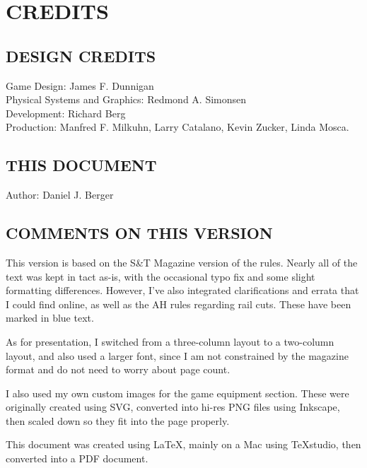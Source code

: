 \section{CREDITS}

\subsection{DESIGN CREDITS}

Game Design: James F. Dunnigan\\
Physical Systems and Graphics: Redmond A. Simonsen\\
Development: Richard Berg\\
Production: Manfred F. Milkuhn, Larry Catalano, Kevin Zucker, Linda Mosca.

\subsection{THIS DOCUMENT}

Author: Daniel J. Berger

\subsection{COMMENTS ON THIS VERSION}

This version is based on the S\&T Magazine version of the rules. Nearly all of the text was kept in tact as-is, with the occasional typo fix and some slight formatting differences. However, I've also integrated clarifications and errata that I could find online, as well as the AH rules regarding rail cuts. These have been marked in blue text.

As for presentation, I switched from a three-column layout to a two-column layout, and also used a larger font, since I am not constrained by the magazine format and do not need to worry about page count.

I also used my own custom images for the game equipment section. These were originally created using SVG, converted into hi-res PNG files using Inkscape, then scaled down so they fit into the page properly.

This document was created using LaTeX, mainly on a Mac using TeXstudio, then converted into a PDF document.
